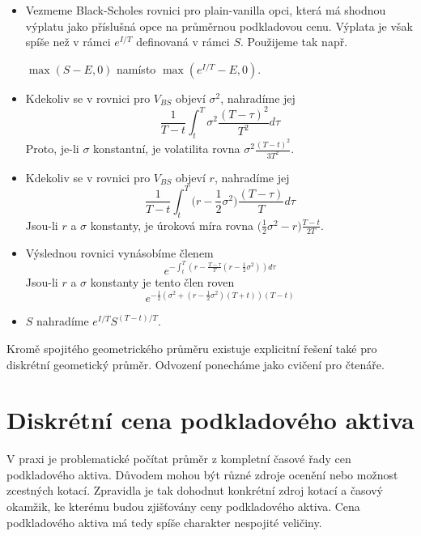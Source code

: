 \documentclass[a4paper]{book}
\begin{document}
\begin{itemize}
\item Vezmeme Black-Scholes rovnici pro plain-vanilla opci, která má shodnou výplatu jako příslušná opce na průměrnou podkladovou cenu. Výplata je však spíše než v rámci $e^{I/T}$ definovaná v rámci $S$. Použijeme tak např.
\begin{center}
$\max(S - E, 0)$ namísto $\max(e^{I/T} - E, 0)$.
\end{center}
\item Kdekoliv se v rovnici pro $V_{BS}$ objeví $\sigma^2$, nahradíme jej
\begin{equation*}
\frac{1}{T - t} \int_t^T \sigma^2 \frac{(T - \tau)^2}{T^2} d \tau
\end{equation*}
Proto, je-li $\sigma$ konstantní, je volatilita rovna $\sigma^2 \frac{(T - t)^2}{3T^2}$.
\item Kdekoliv se v rovnici pro $V_{BS}$ objeví $r$, nahradíme jej
\begin{equation*}
\frac{1}{T - t}\int_t^T \Big( r - \frac{1}{2}\sigma^2 \Big) \frac{(T - \tau)}{T} d \tau
\end{equation*}
Jsou-li $r$ a $\sigma$ konstanty, je úroková míra rovna $\Big( \frac{1}{2}\sigma^2 - r \Big) \frac{T - t}{2T}$.
\item Výslednou rovnici vynásobíme členem
\begin{equation*}
e^{- \int_t^T (r - \frac{T - \tau}{T}(r - \frac{1}{2}\sigma^2)) d \tau}
\end{equation*}
Jsou-li $r$ a $\sigma$ konstanty je tento člen roven 
\begin{equation*}
e^{-\frac{1}{2}(\sigma^2 + (r - \frac{1}{2} \sigma^2)(T + t))(T - t)}
\end{equation*}
\item $S$ nahradíme $e^{I/T}S^{(T-t)/T}$.
\end{itemize}
Kromě spojitého geometrického průměru existuje explicitní řešení také pro diskrétní geometický průměr. Odvození ponecháme jako cvičení pro čtenáře.

\section{Diskrétní cena podkladového aktiva}

V praxi je problematické počítat průměr z kompletní časové řady cen podkladového aktiva. Důvodem mohou být různé zdroje ocenění nebo možnost zcestných kotací. Zpravidla je tak dohodnut konkrétní zdroj kotací a časový okamžik, ke kterému budou zjišťovány ceny podkladového aktiva. Cena podkladového aktiva má tedy spíše charakter nespojité veličiny.
\end{document}
